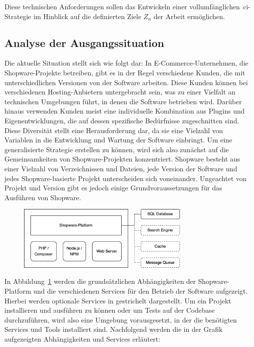 Diese technischen Anforderungen sollen das Entwickeln einer vollumfänglichen\ \acrshort{ci}-Strategie im Hinblick auf
die definierten Ziele $Z_n$ der Arbeit ermöglichen.

\subsection{Analyse der Ausgangssituation} \label{subsec:03-concept-2}

Die aktuelle Situation stellt sich wie folgt dar: In E-Commerce-Unternehmen, die Shopware-Projekte betreiben, gibt es in
der Regel verschiedene Kunden, die mit unterschiedlichen Versionen von der Software arbeiten.
Diese Kunden können bei verschiedenen Hosting-Anbietern untergebracht sein, was zu einer Vielfalt an technischen
Umgebungen führt, in denen die Software betrieben wird.
Darüber hinaus verwenden Kunden meist eine individuelle Kombination aus Plugins und Eigenentwicklungen, die auf dessen
spezifische Bedürfnisse zugeschnitten sind.
Diese Diversität stellt eine Herausforderung dar, da sie eine Vielzahl von Variablen in die Entwicklung und Wartung der
Software einbringt.
Um eine generalisierte Strategie erstellen zu können, wird sich also zunächst auf die Gemeinsamkeiten von
Shopware-Projekten konzentriert.
Shopware besteht aus einer Vielzahl von Verzeichnissen und Dateien, jede Version der Software und jedes
Shopware-basierte Projekt unterscheiden sich voneinander.
Ungeachtet von Projekt und Version gibt es jedoch einige Grundvoraussetzungen für das Ausführen von Shopware.

\begin{figure}[H]
    \centering
    \includegraphics[width=0.75\textwidth]{images/content/shopware-requirements}
    \label{fig:shopware-requirements}
\end{figure}

In Abbildung\ \ref{fig:shopware-requirements} werden die grundsätzlichen Abhängigkeiten der Shopware-Platform und die
verschiedenen Services für den Betrieb der Software aufgezeigt.
Hierbei werden optionale Services in gestrichelt dargestellt.
Um ein Projekt installieren und ausführen zu können oder um Tests auf der Codebase durchzuführen, wird also eine
Umgebung vorausgesetzt, in der die benötigten Services und Tools installiert sind.
Nachfolgend werden die in der Grafik aufgezeigten Abhängigkeiten und Services erläutert:

